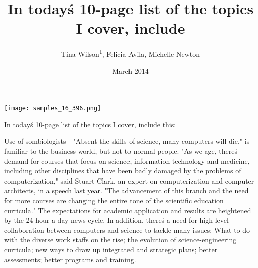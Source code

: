 \documentclass{article}
\title{In today\'s 10-page list of the topics I cover, include}
\author{Tina Wilson\textsuperscript{1},  Felicia Avila,  Michelle Newton}
\affil{\textsuperscript{1}Duke-NUS Medical School}
\date{March 2014}
\begin{document}
\maketitle

\begin{center}
\begin{minipage}{0.75\linewidth}
\texttt{[image: samples\_16\_396.png]}
\end{minipage}
\end{center}

In today\'s 10-page list of the topics I cover, include this:

Use of sombiologists - "Absent the skills of science, many computers will die," is familiar to the business world, but not to normal people. "As we age, there\'s demand for courses that focus on science, information technology and medicine, including other disciplines that have been badly damaged by the problems of computerization," said Stuart Clark, an expert on computerization and computer architects, in a speech last year. "The advancement of this branch and the need for more courses are changing the entire tone of the scientific education curricula." The expectations for academic application and results are heightened by the 24-hour-a-day news cycle. In addition, there\'s a need for high-level collaboration between computers and science to tackle many issues: What to do with the diverse work staffs on the rise; the evolution of science-engineering curricula; new ways to draw up integrated and strategic plans; better assessments; better programs and training.
\end{document}
